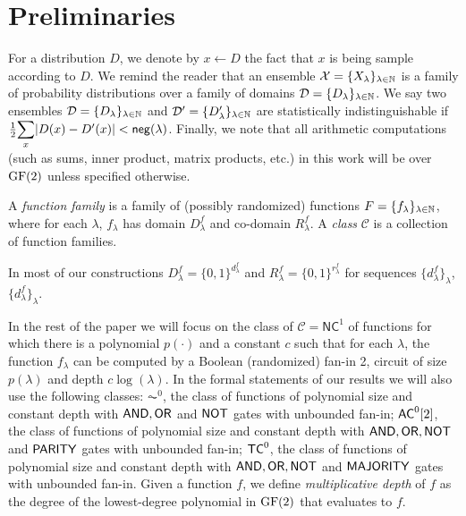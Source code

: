\section{Preliminaries}
\label{sec:prelim}




For a distribution $D$, we denote by $x \gets D$ the fact that $x$ is being sample according to $D$.
We remind the reader that an ensemble $\mathcal{X} = \{X_{\lambda}\}_{\lambda\in\mathbb{N}}$ is a family of  probability distributions over a family of domains $\mathcal{D}=\{D_{\lambda}\}_{\lambda\in\mathbb{N}}$. We say two ensembles $\mathcal{D} = \{D_{\lambda}\}_{\lambda\in\mathbb{N}}$ and $\mathcal{D}' = \{D'_{\lambda}\}_{\lambda\in\mathbb{N}}$ are statistically indistinguishable if $\frac{1}{2}\Sum_x |D(x)-D'(x)| < \negl(\lambda)$. 
Finally, we note that all arithmetic computations (such as sums, inner product, matrix products, etc.) in this work will be over $\text{GF}(2)$ unless specified otherwise.

\begin{definition}
A {\em function family} is a family of (possibly randomized) functions $F = \{f_{\lambda}\}_{\lambda\in\mathbb{N}}$, where for each $\lambda$, $f_{\lambda}$ has domain $D^f_{\lambda}$ and co-domain $R^f_{\lambda}$. A {\em class} $\mathcal{C}$ 
is a collection of function families. 
\end{definition}
In most of our constructions $D^f_{\lambda}=\{0,1\}^{d_\lambda^f}$ and $R^f_{\lambda}=\{0,1\}^{r_\lambda^f}$ for sequences $\{d_\lambda^f\}_\lambda$, 
$\{d_\lambda^f\}_\lambda$. 

In the rest of the paper we will focus on the class of $\mathcal{C}=\mathsf{NC}^1$ of functions for which there is a polynomial $p(\cdot)$ and a constant $c$ such that for each $\lambda$, the function $f_\lambda$ can be computed by a Boolean (randomized) fan-in 2, circuit of size $p(\lambda)$ and depth $c \log(\lambda)$. In the formal statements of our results we will also use the following classes: $\AC^0$, the class of functions of polynomial size and constant depth with $\mathsf{AND}, \mathsf{OR}$ and $\mathsf{NOT}$ gates with unbounded fan-in; ${\mathsf{AC}}^0[2]$, the class of functions of polynomial size and constant depth with $\mathsf{AND}, \mathsf{OR}, \mathsf{NOT}$ and $\mathsf{PARITY}$ gates with unbounded fan-in; ${\mathsf{TC}}^0$, the class of functions of polynomial size and constant depth with $\mathsf{AND}, \mathsf{OR}, \mathsf{NOT}$ and $\mathsf{MAJORITY}$ gates with unbounded fan-in.
Given a function $f$, we define \textit{multiplicative depth} of $f$ as the degree of the lowest-degree polynomial in $\text{GF}(2)$ that evaluates to $f$.

